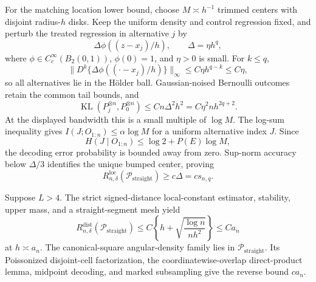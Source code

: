 For the matching location lower bound, choose \(M\asymp h^{-1}\) trimmed centers with disjoint radius-\(h\) disks.  Keep the uniform density and control regression fixed, and perturb the treated regression in alternative \(j\) by
\[
 \Delta\phi((z-x_j)/h),
 \qquad \Delta=\eta h^q,
\]
where \(\phi\in C_c^\infty(B_2(0,1))\), \(\phi(0)=1\), and \(\eta>0\) is small.  For \(k\leq q\),
\[
 \lVert D^k\{\Delta\phi((\cdot-x_j)/h)\}\rVert_\infty
 \leq C\eta h^{q-k}\leq C\eta,
\]
so all alternatives lie in the H\"older ball.  Gaussian-noised Bernoulli outcomes retain the common tail bounds, and
\[
 \operatorname{KL}(P_j^{\otimes n},P_0^{\otimes n})
 \leq Cn\Delta^2h^2=C\eta^2nh^{2q+2}.
\]
At the displayed bandwidth this is a small multiple of \(\log M\).  The log-sum inequality gives \(I(J;O_{1:n})\leq\alpha\log M\) for a uniform alternative index \(J\).  Since
\[
 H(J\mid O_{1:n})\leq\log2+P(E)\log M,
\]
the decoding error probability is bounded away from zero.  Sup-norm accuracy below \(\Delta/3\) identifies the unique bumped center, proving
\[
 R_{n,\delta}^{\mathrm{loc}}(\mathcal P_{\mathrm{straight}})
 \geq c\Delta=cs_{n,q}.
\]

Suppose \(L>4\).  The strict signed-distance local-constant estimator, stability, upper mass, and a straight-segment mesh yield
\[
 R_{n,\delta}^{\mathrm{dist}}(\mathcal P_{\mathrm{straight}})
 \leq C\left\{h+\sqrt{\frac{\log n}{nh^2}}\right\}\leq Ca_n
\]
at \(h\asymp a_n\).  The canonical-square angular-density family lies in \(\mathcal P_{\mathrm{straight}}\).  Its Poissonized disjoint-cell factorization, the coordinatewise-overlap direct-product lemma, midpoint decoding, and marked subsampling give the reverse bound \(ca_n\).

